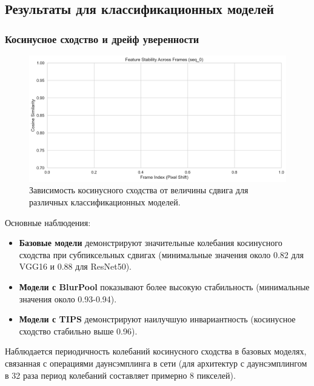 \subsection{Результаты для классификационных моделей}
\label{sec:experiments:classification}

\subsubsection{Косинусное сходство и дрейф уверенности}
\label{sec:experiments:classification:cosine}

\begin{figure}[ht]
\centering
\includegraphics[width=\textwidth]{images/classification/cosine_similarity_comparison_seq_0.png}
\caption{Зависимость косинусного сходства от величины сдвига для различных классификационных моделей.}
\label{fig:cosine_similarity}
\end{figure}

Основные наблюдения:

\begin{itemize}
    \item \textbf{Базовые модели} демонстрируют значительные колебания косинусного сходства при субпиксельных сдвигах (минимальные значения около 0.82 для VGG16 и 0.88 для ResNet50).
    \item \textbf{Модели с BlurPool} показывают более высокую стабильность (минимальные значения около 0.93-0.94).
    \item \textbf{Модели с TIPS} демонстрируют наилучшую инвариантность (косинусное сходство стабильно выше 0.96).
\end{itemize}

Наблюдается периодичность колебаний косинусного сходства в базовых моделях, связанная с операциями даунсэмплинга в сети (для архитектур с даунсэмплингом в 32 раза период колебаний составляет примерно 8 пикселей).

